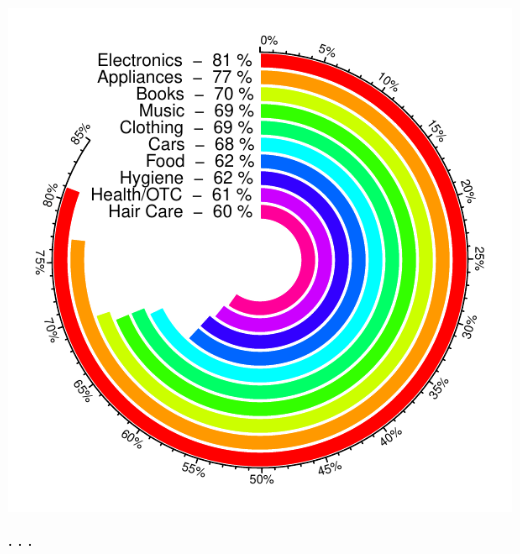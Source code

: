 \documentclass{article}\usepackage[]{graphicx}\usepackage[]{color}
\makeatletter
\def\maxwidth{ %
  \ifdim\Gin@nat@width>\linewidth
    \linewidth
  \else
    \Gin@nat@width
  \fi
}
\newenvironment{knitrout}{}{} %
\makeatother
\begin{document}
\begin{knitrout}
\color{fgcolor}

{\centering \includegraphics[width=\maxwidth]{figure/plot_circlize_cb-1} 

}



\end{knitrout}
\begin{center}
\textbf{. . .}
\end{center}
\end{document}
